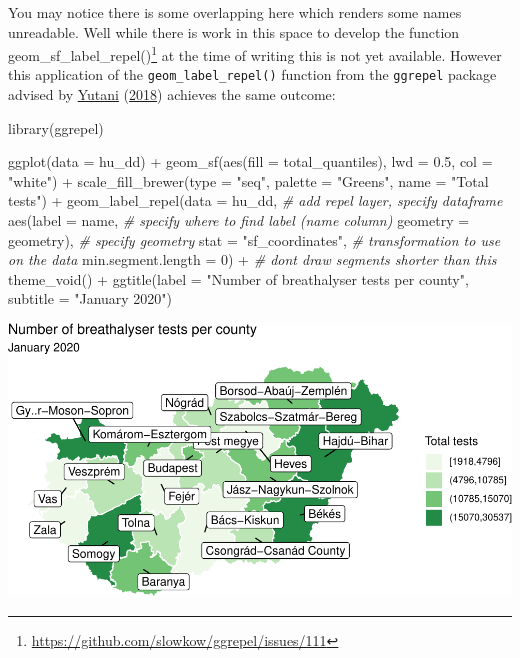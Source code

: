 \documentclass[
]{book}
\makeatletter
\newenvironment{Shaded}{\begin{snugshade}}{\end{snugshade}}
\newcommand{\AttributeTok}[1]{\textcolor[rgb]{0.61,0.61,0.61}{#1}}
\newcommand{\CommentTok}[1]{\textcolor[rgb]{0.37,0.37,0.37}{\textit{#1}}}
\newcommand{\DecValTok}[1]{\textcolor[rgb]{0.06,0.06,0.06}{#1}}
\newcommand{\FloatTok}[1]{\textcolor[rgb]{0.06,0.06,0.06}{#1}}
\newcommand{\FunctionTok}[1]{\textcolor[rgb]{0,0,0}{#1}}
\newcommand{\NormalTok}[1]{#1}
\newcommand{\SpecialCharTok}[1]{\textcolor[rgb]{0,0,0}{#1}}
\newcommand{\StringTok}[1]{\textcolor[rgb]{0.5,0.5,0.5}{#1}}
\renewcommand{\href}[2]{#2\footnote{\url{#1}}}
\newenvironment{kframe}{%
\medskip{}
\setlength{\fboxsep}{.8em}
 \def\at@end@of@kframe{}%
 \ifinner\ifhmode%
  \def\at@end@of@kframe{\end{minipage}}%
  \begin{minipage}{\columnwidth}%
 \fi\fi%
 \def\FrameCommand##1{\hskip\@totalleftmargin \hskip-\fboxsep
 \colorbox{shadecolor}{##1}\hskip-\fboxsep
     \hskip-\linewidth \hskip-\@totalleftmargin \hskip\columnwidth}%
 \MakeFramed {\advance\hsize-\width
   \@totalleftmargin\z@ \linewidth\hsize
   \@setminipage}}%
 {\par\unskip\endMakeFramed%
 \at@end@of@kframe}
\renewenvironment{Shaded}{\begin{kframe}}{\end{kframe}}
\makeatother
\begin{document}
You may notice there is some overlapping here which renders some names unreadable. Well while \href{https://github.com/slowkow/ggrepel/issues/111}{there is work in this space to develop the function geom\_sf\_label\_repel()} at the time of writing this is not yet available. However this application of the \texttt{geom\_label\_repel()} function from the \texttt{ggrepel} package advised by \protect\hyperlink{ref-Yutani_2018}{Yutani} (\protect\hyperlink{ref-Yutani_2018}{2018}) achieves the same outcome:

\begin{Shaded}
\begin{Highlighting}[]
\FunctionTok{library}\NormalTok{(ggrepel)}

\FunctionTok{ggplot}\NormalTok{(}\AttributeTok{data =}\NormalTok{ hu\_dd) }\SpecialCharTok{+} 
  \FunctionTok{geom\_sf}\NormalTok{(}\FunctionTok{aes}\NormalTok{(}\AttributeTok{fill =}\NormalTok{ total\_quantiles), }
          \AttributeTok{lwd =} \FloatTok{0.5}\NormalTok{, }\AttributeTok{col =} \StringTok{"white"}\NormalTok{) }\SpecialCharTok{+} 
  \FunctionTok{scale\_fill\_brewer}\NormalTok{(}\AttributeTok{type =} \StringTok{"seq"}\NormalTok{, }
                    \AttributeTok{palette =} \StringTok{"Greens"}\NormalTok{, }
                    \AttributeTok{name =} \StringTok{"Total tests"}\NormalTok{) }\SpecialCharTok{+} 
  \FunctionTok{geom\_label\_repel}\NormalTok{(}\AttributeTok{data =}\NormalTok{ hu\_dd,       }\CommentTok{\# add repel layer, specify dataframe}
                   \FunctionTok{aes}\NormalTok{(}\AttributeTok{label =}\NormalTok{ name,   }\CommentTok{\# specify where to find label (name column)}
                       \AttributeTok{geometry =}\NormalTok{ geometry),  }\CommentTok{\# specify geometry}
                   \AttributeTok{stat =} \StringTok{"sf\_coordinates"}\NormalTok{,  }\CommentTok{\# transformation to use on the data}
                   \AttributeTok{min.segment.length =} \DecValTok{0}\NormalTok{) }\SpecialCharTok{+} \CommentTok{\# don\textquotesingle{}t draw segments shorter than this}
  \FunctionTok{theme\_void}\NormalTok{() }\SpecialCharTok{+} 
  \FunctionTok{ggtitle}\NormalTok{(}\AttributeTok{label =} \StringTok{"Number of breathalyser tests per county"}\NormalTok{, }
          \AttributeTok{subtitle =} \StringTok{"January 2020"}\NormalTok{) }
\end{Highlighting}
\end{Shaded}

\includegraphics{crime_mapping_files/figure-latex/unnamed-chunk-160-1.pdf}
\end{document}
